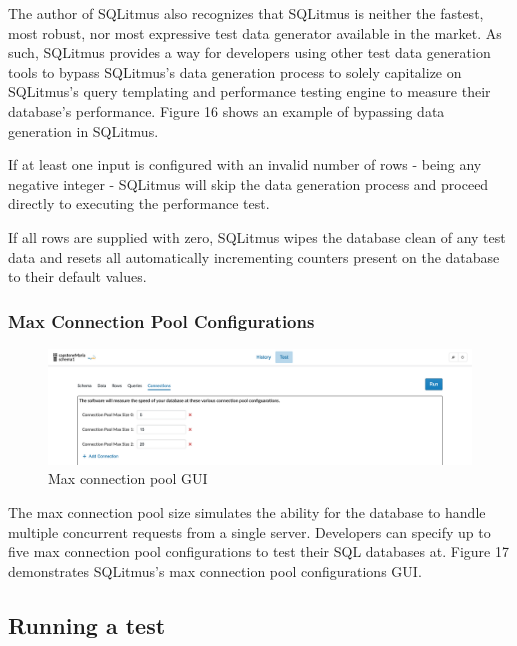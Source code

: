 \documentclass[12pt]{article}
\begin{document}
\begin{spacing}{1.9}
	The author of SQLitmus also recognizes that SQLitmus is neither the fastest, most robust, nor most expressive test data generator available in the market. As such, SQLitmus provides a way for developers using other test data generation tools to bypass SQLitmus's data generation process to solely capitalize on SQLitmus's query templating and performance testing engine to measure their database's performance. Figure 16 shows an example of bypassing data generation in SQLitmus.
	
	If at least one input is configured with an invalid number of rows - being any negative integer - SQLitmus will skip the data generation process and proceed directly to executing the performance test. 
	
	If all rows are supplied with zero, SQLitmus wipes the database clean of any test data and resets all automatically incrementing counters present on the database to their default values.
	
	\subsubsection{ Max Connection Pool Configurations}
	
	\begin{figure}[H]
		\centering
		\includegraphics[width=\textwidth]{3-4-2.png}
		\caption{Max connection pool GUI }
		
	\end{figure}
	
	The max connection pool size simulates the ability for the database to handle multiple concurrent requests from a single server. Developers can specify up to five max connection pool configurations to test their SQL databases at. Figure 17 demonstrates SQLitmus's max connection pool configurations GUI.
	
	\subsection{ Running a test}
	

\end{spacing}
\end{document}
